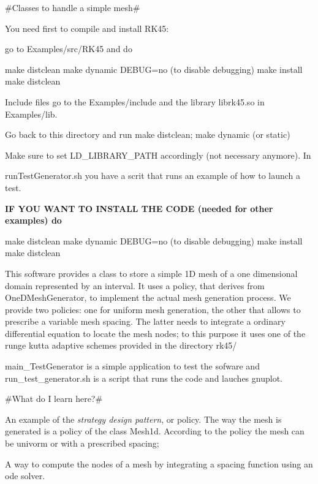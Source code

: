 \#\+Classes to handle a simple mesh\#

You need first to compile and install R\+K45\+:

go to {\ttfamily Examples/src/\+R\+K45} and do \begin{DoxyVerb}make distclean
make dynamic DEBUG=no  (to disable debugging)
make install
make distclean
\end{DoxyVerb}


Include files go to the {\ttfamily Examples/include} and the library {\ttfamily librk45.\+so} in {\ttfamily Examples/lib}.

Go back to this directory and run make distclean; make dynamic (or static)

Make sure to set {\ttfamily L\+D\+\_\+\+L\+I\+B\+R\+A\+R\+Y\+\_\+\+P\+A\+TH} accordingly (not necessary anymore). In

{\ttfamily run\+Test\+Generator.\+sh} you have a scrit that runs an example of how to launch a test.

{\bfseries{IF Y\+OU W\+A\+NT TO I\+N\+S\+T\+A\+LL T\+HE C\+O\+DE (needed for other examples) do}} \begin{DoxyVerb}make distclean
make dynamic DEBUG=no  (to disable debugging)
make install
make distclean
\end{DoxyVerb}


This software provides a class to store a simple 1D mesh of a one dimensional domain represented by an interval. It uses a policy, that derives from {\ttfamily One\+D\+Mesh\+Generator}, to implement the actual mesh generation process. We provide two policies\+: one for uniform mesh generation, the other that allows to prescribe a variable mesh spacing. The latter needs to integrate a ordinary differential equation to locate the mesh nodes; to this purpose it uses one of the runge kutta adaptive schemes provided in the directory {\ttfamily rk45/}

{\ttfamily main\+\_\+\+Test\+Generator} is a simple application to test the sofware and {\ttfamily run\+\_\+test\+\_\+generator.\+sh} is a script that runs the code and lauches {\ttfamily gnuplot}.

\#\+What do I learn here?\#
\begin{DoxyItemize}
\item An example of the {\itshape strategy design pattern}, or policy. The way the mesh is generated is a policy of the class Mesh1d. According to the policy the mesh can be univorm or with a prescribed spacing;
\item A way to compute the nodes of a mesh by integrating a spacing function using an ode solver. 
\end{DoxyItemize}